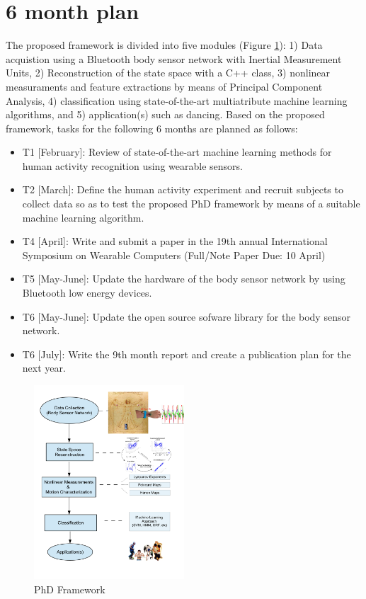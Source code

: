 \documentclass{sigchi}
\begin{document}
\section{6 month plan}
The proposed framework is divided into five modules (Figure \ref{fig:proposedapproach}): 
1) Data acquistion using a Bluetooth body sensor network with Inertial Measurement Units, 
2) Reconstruction of the state space with a C++ class, 
3) nonlinear measuraments and feature extractions by means of Principal Component
Analysis, 
4) classification using state-of-the-art multiatribute machine learning algorithms, 
and  5) application(s) such as dancing. 
Based on the proposed framework, 
tasks for the following 6 months are planned as follows:
\begin{itemize}
\item T1 [February]: Review of state-of-the-art machine learning methods 
for human activity recognition using wearable sensors.
\item T2 [March]: Define the human activity experiment and recruit subjects 
to collect data so as to test the proposed PhD framework by means of a suitable
machine learning algorithm.
\item T4 [April]: Write and submit a paper in the 19th annual International Symposium
on Wearable Computers (Full/Note Paper Due: 10 April)
\item T5 [May-June]: Update the hardware of the body sensor network by using
Bluetooth low energy devices.  
\item T6 [May-June]: Update the open source sofware library for the body sensor
network.
\item T6 [July]: Write the 9th month report and create a publication
plan for the next year.
\end{itemize}

\begin{figure}[htbp!] 
\centering    
\includegraphics[width=0.5\textwidth]{proposedapproach_v1}
\caption[PA]{PhD Framework}
\label{fig:proposedapproach}
\end{figure}
\end{document}
